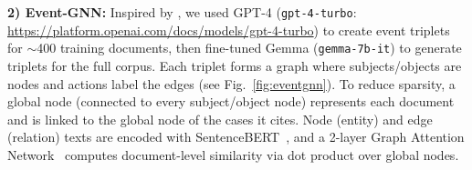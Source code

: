 \noindent \textbf{2) Event-GNN:}
Inspired by \citet{li2023findkg}, we used GPT-4 (\texttt{gpt-4-turbo}: \url{https://platform.openai.com/docs/models/gpt-4-turbo}) to create event triplets for $\sim$400 training documents, then fine-tuned Gemma (\texttt{gemma-7b-it}) to generate triplets for the full corpus. Each triplet forms a graph where subjects/objects are nodes and actions label the edges (see Fig.~\ref{fig:eventgnn}). To reduce sparsity, a global node (connected to every subject/object node) represents each document and is linked to the global node of the cases it cites. Node (entity) and edge (relation) texts are encoded with SentenceBERT~\citep{reimers2019sentencebert}, and a 2-layer Graph Attention Network~\citep{tang2024casegnn++} computes document-level similarity via dot product over global nodes.


